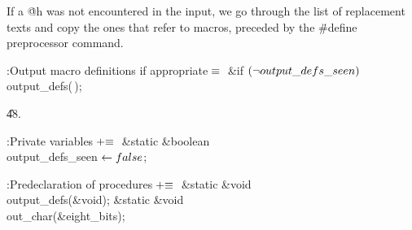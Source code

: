 If a \.{@h} was not encountered in the input,
we go through the list of replacement texts and copy the ones
that refer to macros, preceded by the \.{\#define} preprocessor command.

\Y\B\4:Output macro definitions if appropriate\X${}\equiv{}$\6
\&{if} ${}(\lnot\\{output\_defs\_seen}){}$\1\5
\\{output\_defs}(\,);\2\par
\U48.\fi

\B{}:Private variables\X${}\mathrel+\equiv{}$\6
\&{static} \&{boolean} \\{output\_defs\_seen}${}\leftarrow\\{false}{}$;\par
\fi

\B{}:Predeclaration of procedures\X${}\mathrel+\equiv{}$\6
\&{static} \&{void} \\{output\_defs}(\&{void});\6
\&{static} \&{void} \\{out\_char}(\&{eight\_bits});\par
\fi

